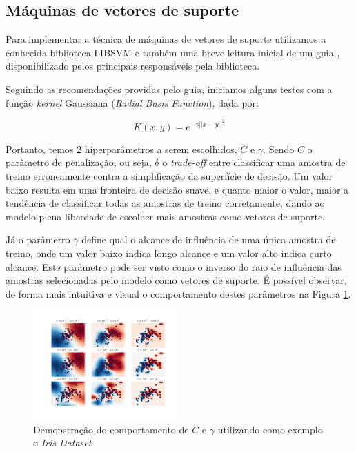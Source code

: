 \subsection{Máquinas de vetores de suporte}

Para implementar a técnica de máquinas de vetores de suporte utilizamos a conhecida biblioteca LIBSVM \cite{libsvm} e também uma breve leitura inicial de um guia \cite{libsvm_guide}, disponibilizado pelos principais responsáveis pela biblioteca.

Seguindo as recomendações providas pelo guia, iniciamos alguns testes com a função \emph{kernel} Gaussiana (\emph{Radial Basis Function}), dada por:

\begin{equation}
	K(x, y) = e^{-\gamma ||x - y||^2}
\end{equation}

Portanto, temos 2 hiperparâmetros a serem escolhidos, $C$ e $\gamma$. Sendo $C$ o parâmetro de penalização, ou seja, é o \emph{trade-off} entre classificar uma amostra de treino erroneamente contra a simplificação da superfície de decisão. Um valor baixo resulta em uma fronteira de decisão suave, e quanto maior o valor, maior a tendência de classificar todas as amostras de treino corretamente, dando ao modelo plena liberdade de escolher mais amostras como vetores de suporte.

Já o parâmetro $\gamma$ define qual o alcance de influência de uma única amostra de treino, onde um valor baixo indica longo alcance e um valor alto indica curto alcance. Este parâmetro pode ser visto como o inverso do raio de influência das amostras selecionadas pelo modelo como vetores de suporte. É possível observar, de forma mais intuitiva e visual o comportamento destes parâmetros na Figura \ref{fig:grafico_rbf_demo}.

\begin{figure}[ht]
  \centering
    \includegraphics[width=0.5\textwidth]{rbf_hyperparams_demo.png}
    \caption{Demonstração do comportamento de $C$ e $\gamma$ utilizando como exemplo o \emph{Iris Dataset} \cite{uci_ml_repo}}
    \label{fig:grafico_rbf_demo}
\end{figure}

